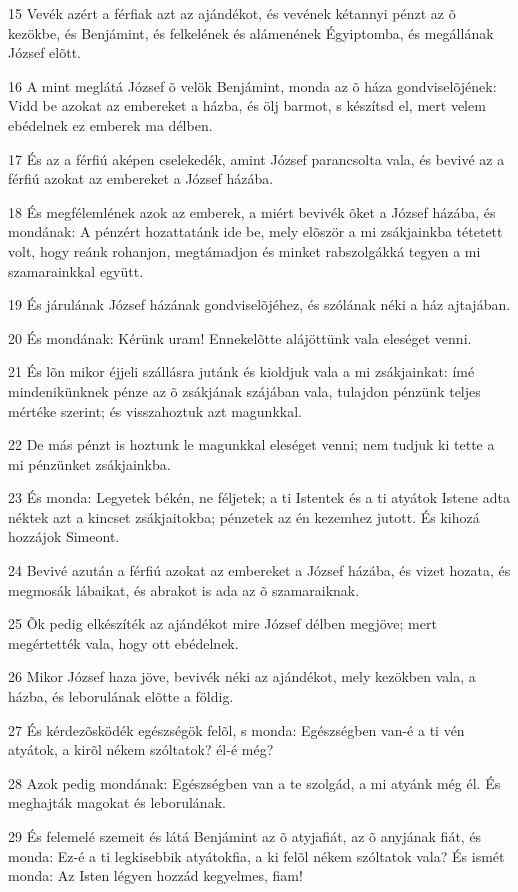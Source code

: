 \par 15 Vevék azért a férfiak azt az ajándékot, és vevének kétannyi pénzt az õ kezökbe, és Benjámint, és felkelének és alámenének Égyiptomba, és megállának József elõtt.
\par 16 A mint meglátá József õ velök Benjámint, monda az õ háza gondviselõjének: Vidd be azokat az embereket a házba, és ölj barmot, s készítsd el, mert velem ebédelnek ez emberek ma délben.
\par 17 És az a férfiú aképen cselekedék, amint József parancsolta vala, és bevivé az a férfiú azokat az embereket a József házába.
\par 18 És megfélemlének azok az emberek, a miért bevivék õket a József házába, és mondának: A pénzért hozattatánk ide be, mely elõször a mi zsákjainkba tétetett volt, hogy reánk rohanjon, megtámadjon és minket rabszolgákká tegyen a mi szamarainkkal együtt.
\par 19 És járulának József házának gondviselõjéhez, és szólának néki a ház ajtajában.
\par 20 És mondának: Kérünk uram! Ennekelõtte alájöttünk vala eleséget venni.
\par 21 És lõn mikor éjjeli szállásra jutánk és kioldjuk vala a mi zsákjainkat: ímé mindenikünknek pénze az õ zsákjának szájában vala, tulajdon pénzünk teljes mértéke szerint; és visszahoztuk azt magunkkal.
\par 22 De más pénzt is hoztunk le magunkkal eleséget venni; nem tudjuk ki tette a mi pénzünket zsákjainkba.
\par 23 És monda: Legyetek békén, ne féljetek; a ti Istentek és a ti atyátok Istene adta néktek azt a kincset zsákjaitokba; pénzetek az én kezemhez jutott. És kihozá hozzájok Simeont.
\par 24 Bevivé azután a férfiú azokat az embereket a József házába, és vizet hozata, és megmosák lábaikat, és abrakot is ada az õ szamaraiknak.
\par 25 Õk pedig elkészíték az ajándékot mire József délben megjöve; mert megértették vala, hogy ott ebédelnek.
\par 26 Mikor József haza jöve, bevivék néki az ajándékot, mely kezökben vala, a házba, és leborulának elõtte a földig.
\par 27 És kérdezõsködék egészségök felõl, s monda: Egészségben van-é a ti vén atyátok, a kirõl nékem szóltatok? él-é még?
\par 28 Azok pedig mondának: Egészségben van a te szolgád, a mi atyánk még él. És meghajták magokat és leborulának.
\par 29 És felemelé szemeit és látá Benjámint az õ atyjafiát, az õ anyjának fiát, és monda: Ez-é a ti legkisebbik atyátokfia, a ki felõl nékem szóltatok vala? És ismét monda: Az Isten légyen hozzád kegyelmes, fiam!
